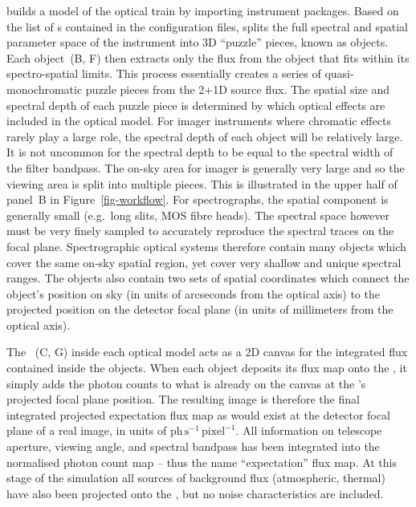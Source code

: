 \ScopeSim{} builds a model of the optical train by importing instrument packages.
Based on the list of \Effect{}s contained in the configuration files, \ScopeSim{} splits the full spectral and spatial parameter space of the instrument into 3D ``puzzle'' pieces, known as \FieldOfView{} objects.
Each \FieldOfView{} object~(B, F) then extracts only the flux from the \Source{} object that fits within its spectro-spatial limits.
This process essentially creates a series of quasi-monochromatic puzzle pieces from the 2+1D source flux.
The spatial size and spectral depth of each puzzle piece is determined by which optical effects are included in the optical model.
For imager instruments where chromatic effects rarely play a large role, the spectral depth of each \FieldOfView{} object will be relatively large.
It is not uncommon for the spectral depth to be equal to the spectral width of the filter bandpass.
The on-sky area for imager is generally very large and so the viewing area is split into multiple pieces.
This is illustrated in the upper half of panel~B in Figure~\ref{fig-workflow}.
For spectrographs, the spatial component is generally small (e.g.~long slits, MOS fibre heads).
The spectral space however must be very finely sampled to accurately reproduce the spectral traces on the focal plane.
Spectrographic optical systems therefore contain many \FieldOfView{} objects which cover the same on-sky spatial region, yet cover very shallow and unique spectral ranges.
The \FieldOfView{} objects also contain two sets of spatial coordinates which connect the object's position on sky (in units of arcseconds from the optical axis) to the projected position on the detector focal plane (in units of millimeters from the optical axis).

The \ImagePlane{}~(C, G) inside each optical model acts as a 2D canvas for the integrated flux contained inside the \FieldOfView{} objects.
When each \FieldOfView{} object deposits its flux map onto the \ImagePlane{}, it simply adds the photon counts to what is already on the canvas at the \FieldOfView{}'s projected focal plane position.
The resulting \ImagePlane{} image is therefore the final integrated projected expectation flux map as would exist at the detector focal plane of a real image, in units of $\mathrm{ph\,s^{-1}\,pixel^{-1}}$.
All information on telescope aperture, viewing angle, and spectral bandpass has been integrated into the normalised photon count map -- thus the name ``expectation'' flux map.
At this stage of the simulation all sources of background flux (atmospheric, thermal) have also been projected onto the \ImagePlane{}, but no noise characteristics are included.

